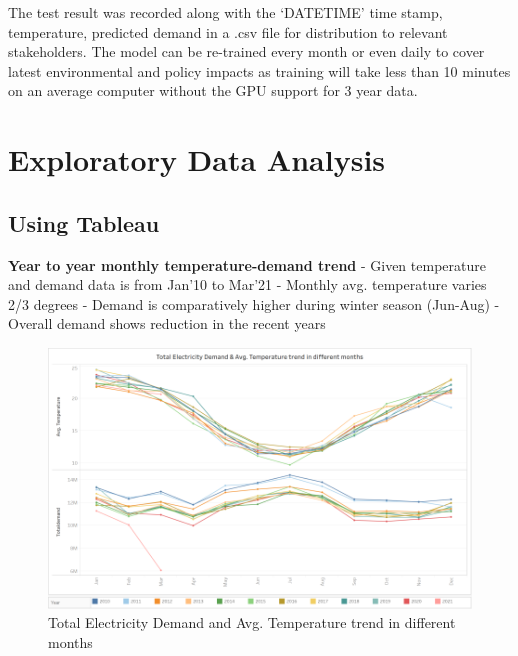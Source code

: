 \documentclass[mstat,12pt]{unswthesis}
\begin{document}
\bigskip

The test result was recorded along with the `DATETIME' time stamp,
temperature, predicted demand in a .csv file for distribution to
relevant stakeholders. The model can be re-trained every month or even
daily to cover latest environmental and policy impacts as training will
take less than 10 minutes on an average computer without the GPU support
for 3 year data.

\hypertarget{exploratory-data-analysis}{%
\chapter{Exploratory Data Analysis}\label{exploratory-data-analysis}}

\hypertarget{using-tableau}{%
\section{Using Tableau}\label{using-tableau}}

\textbf{Year to year monthly temperature-demand trend} \newline \newline
- Given temperature and demand data is from Jan'10 to Mar'21 \newline -
Monthly avg. temperature varies 2/3 degrees \newline - Demand is
comparatively higher during winter season (Jun-Aug) \newline - Overall
demand shows reduction in the recent years \newline

\begin{figure}[H]
\includegraphics{snapshots/monthly trend.png}
\caption{Total Electricity Demand and Avg. Temperature trend in different months}\label{4.1}
\end{figure}
\end{document}
